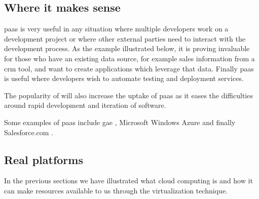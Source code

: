 \subsection{Where it makes sense}
\label{sec:background-paas-whereToUse}
\ac{paas} is very useful in any situation where multiple developers work on a development project or
where other external parties need to interact with the development process. As the example illustrated
below, it is proving invaluable for those who have an existing data source, for example sales information
from a \ac{crm} tool, and want to create applications which leverage that data. Finally \ac{paas} is useful
where developers wish to automate testing and deployment services.

The popularity of  will also increase the uptake of \ac{paas} as it eases the
difficulties around rapid development and iteration of software.

Some examples of \ac{paas} include \ac{gae} \cite{googleAppEngine}, Microsoft Windows Azure
\cite{windowsAzure} and finally Salesforce.com \cite{salesforcePlatform}.

%

\subsection{Real platforms}
\label{sec:background-paas-example}
In the previous sections we have illustrated what cloud computing is and how it can make resources
available to us through the virtualization technique. 

